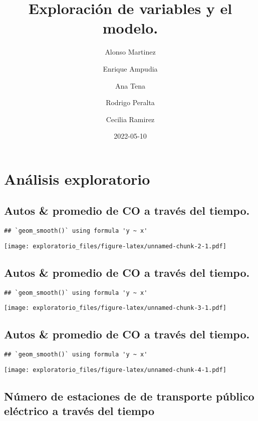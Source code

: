\documentclass[
]{article}
\title{Exploración de variables y el modelo.}
\author{Alonso Martinez \and Enrique Ampudia \and Ana Tena \and Rodrigo
Peralta \and Cecilia Ramirez}
\date{2022-05-10}
\begin{document}
\maketitle

\hypertarget{anuxe1lisis-exploratorio}{%
\section{Análisis exploratorio}\label{anuxe1lisis-exploratorio}}

\hypertarget{autos-promedio-de-co-a-travuxe9s-del-tiempo.}{%
\subsection{Autos \& promedio de CO a través del
tiempo.}\label{autos-promedio-de-co-a-travuxe9s-del-tiempo.}}

\begin{verbatim}
## `geom_smooth()` using formula 'y ~ x'
\end{verbatim}

\texttt{[image: exploratorio\_files/figure-latex/unnamed-chunk-2-1.pdf]}

\hypertarget{autos-promedio-de-co-a-travuxe9s-del-tiempo.-1}{%
\subsection{Autos \& promedio de CO a través del
tiempo.}\label{autos-promedio-de-co-a-travuxe9s-del-tiempo.-1}}

\begin{verbatim}
## `geom_smooth()` using formula 'y ~ x'
\end{verbatim}

\texttt{[image: exploratorio\_files/figure-latex/unnamed-chunk-3-1.pdf]}

\hypertarget{autos-promedio-de-co-a-travuxe9s-del-tiempo.-2}{%
\subsection{Autos \& promedio de CO a través del
tiempo.}\label{autos-promedio-de-co-a-travuxe9s-del-tiempo.-2}}

\begin{verbatim}
## `geom_smooth()` using formula 'y ~ x'
\end{verbatim}

\texttt{[image: exploratorio\_files/figure-latex/unnamed-chunk-4-1.pdf]}

\hypertarget{nuxfamero-de-estaciones-de-de-transporte-puxfablico-eluxe9ctrico-a-travuxe9s-del-tiempo}{%
\subsection{Número de estaciones de de transporte público eléctrico a
través del
tiempo}\label{nuxfamero-de-estaciones-de-de-transporte-puxfablico-eluxe9ctrico-a-travuxe9s-del-tiempo}}
\end{document}

